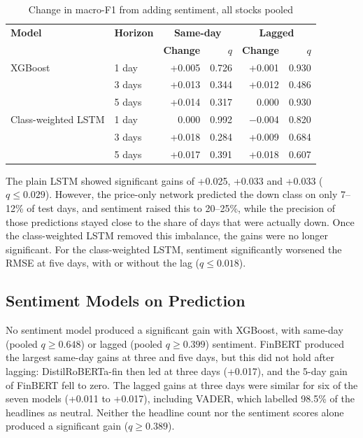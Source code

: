 \documentclass[a4paper,11pt]{article}
\begin{document}
\begin{table}[H]
\centering
\caption{Change in macro-F1 from adding sentiment, all stocks pooled}
\label{tab:paper-gain}
\begin{tabular}{@{}llrrrr@{}}
\toprule
\textbf{Model} & \textbf{Horizon} & \multicolumn{2}{c}{\textbf{Same-day}} & \multicolumn{2}{c}{\textbf{Lagged}} \\
 & & \textbf{Change} & \textbf{$q$} & \textbf{Change} & \textbf{$q$} \\
\midrule
XGBoost & 1 day & +0.005 & 0.726 & +0.001 & 0.930 \\
 & 3 days & +0.013 & 0.344 & +0.012 & 0.486 \\
 & 5 days & +0.014 & 0.317 & 0.000 & 0.930 \\
\midrule
Class-weighted LSTM & 1 day & 0.000 & 0.992 & $-$0.004 & 0.820 \\
 & 3 days & +0.018 & 0.284 & +0.009 & 0.684 \\
 & 5 days & +0.017 & 0.391 & +0.018 & 0.607 \\
\bottomrule
\end{tabular}
\end{table}

The plain LSTM showed significant gains of +0.025, +0.033 and +0.033 ($q \leq 0.029$). However, the price-only network predicted the down class on only 7--12\% of test days, and sentiment raised this to 20--25\%, while the precision of those predictions stayed close to the share of days that were actually down. Once the class-weighted LSTM removed this imbalance, the gains were no longer significant. For the class-weighted LSTM, sentiment significantly worsened the RMSE at five days, with or without the lag ($q \leq 0.018$).

\subsection{Sentiment Models on Prediction}
No sentiment model produced a significant gain with XGBoost, with same-day (pooled $q \geq 0.648$) or lagged (pooled $q \geq 0.399$) sentiment. FinBERT produced the largest same-day gains at three and five days, but this did not hold after lagging: DistilRoBERTa-fin then led at three days (+0.017), and the 5-day gain of FinBERT fell to zero. The lagged gains at three days were similar for six of the seven models (+0.011 to +0.017), including VADER, which labelled 98.5\% of the headlines as neutral. Neither the headline count nor the sentiment scores alone produced a significant gain ($q \geq 0.389$).
\end{document}
